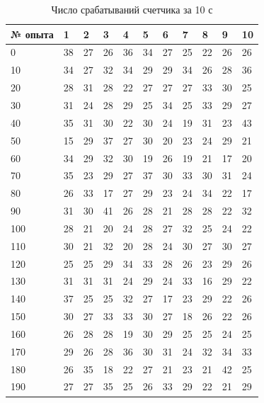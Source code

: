 \documentclass[a4paper,12pt]{article} %
\begin{document}
\begin{table}[p]
\centering
\begin{tabular}{|l|l|l|l|l|l|l|l|l|l|l|}
\hline
№ опыта & 1  & 2  & 3  & 4  & 5  & 6  & 7  & 8  & 9  & 10 \\ \hline
0       & 38 & 27 & 26 & 36 & 34 & 27 & 25 & 22 & 26 & 26 \\
10      & 34 & 27 & 32 & 34 & 29 & 29 & 34 & 26 & 28 & 36 \\
20      & 28 & 31 & 28 & 22 & 27 & 27 & 27 & 33 & 30 & 25 \\
30      & 31 & 24 & 28 & 29 & 25 & 34 & 25 & 33 & 29 & 27 \\
40      & 35 & 31 & 30 & 22 & 30 & 24 & 19 & 31 & 23 & 43 \\
50      & 15 & 29 & 37 & 27 & 30 & 20 & 23 & 24 & 29 & 21 \\
60      & 34 & 29 & 32 & 30 & 19 & 26 & 19 & 21 & 17 & 20 \\
70      & 35 & 23 & 29 & 27 & 37 & 30 & 33 & 30 & 31 & 24 \\
80      & 26 & 33 & 17 & 27 & 29 & 23 & 24 & 34 & 22 & 17 \\
90      & 31 & 30 & 41 & 26 & 28 & 21 & 28 & 28 & 22 & 32 \\
100     & 28 & 21 & 20 & 24 & 28 & 27 & 32 & 25 & 24 & 22 \\
110     & 30 & 21 & 32 & 20 & 28 & 24 & 30 & 27 & 30 & 27 \\
120     & 25 & 25 & 29 & 34 & 33 & 28 & 26 & 23 & 29 & 26 \\
130     & 31 & 31 & 31 & 24 & 29 & 24 & 33 & 16 & 29 & 22 \\
140     & 37 & 25 & 25 & 32 & 27 & 17 & 23 & 29 & 22 & 26 \\
150     & 30 & 27 & 33 & 33 & 30 & 27 & 18 & 26 & 22 & 26 \\
160     & 26 & 28 & 28 & 19 & 30 & 29 & 25 & 25 & 24 & 25 \\
170     & 29 & 26 & 28 & 36 & 30 & 31 & 24 & 32 & 34 & 33 \\
180     & 26 & 35 & 18 & 22 & 27 & 21 & 23 & 21 & 42 & 25 \\
190     & 27 & 27 & 35 & 25 & 26 & 33 & 29 & 22 & 21 & 29 \\ \hline
\end{tabular}
\caption{Число срабатываний счетчика за 10 с}
\end{table}
\end{document}

